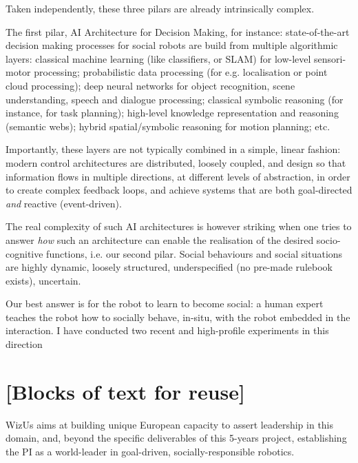 \documentclass[11pt,a4paper]{report}
\newcommand{\project}{WizUs\xspace}
\begin{document}
Taken independently, these three pilars are already intrinsically complex.

The first pilar, AI Architecture for Decision Making, for instance:
state-of-the-art decision making processes for social robots are build from
multiple algorithmic layers: classical machine learning (like classifiers, or
SLAM) for low-level sensori-motor processing; probabilistic data processing (for
e.g. localisation or point cloud processing); deep neural networks for object
recognition, scene understanding, speech and dialogue processing; classical
symbolic reasoning (for instance, for task planning); high-level knowledge
representation and reasoning (semantic webs); hybrid spatial/symbolic reasoning
for motion planning; etc.

Importantly, these layers are not typically combined in a simple, linear
fashion: modern control architectures are distributed, loosely coupled, and
design so that information flows in multiple directions, at different levels of
abstraction, in order to create complex feedback loops, and achieve systems that are
both goal-directed \emph{and} reactive (event-driven).


The real complexity of such AI architectures is however striking when one tries
to answer \emph{how} such an architecture can enable the realisation of the
desired socio-cognitive functions, i.e. our second pilar. Social behaviours and
social situations are highly dynamic, loosely structured, underspecified (no
pre-made rulebook exists), uncertain.

Our best answer is for the robot to learn to become social: a human expert teaches
the robot how to socially behave, in-situ, with the robot embedded in the
interaction. I have conducted two recent and high-profile experiments in this
direction


\section{[Blocks of text for reuse]}

\project aims at building unique European capacity to assert leadership in this
domain, and, beyond the specific deliverables of this 5-years project,
establishing the PI as a world-leader in goal-driven, socially-responsible
robotics.
\end{document}
